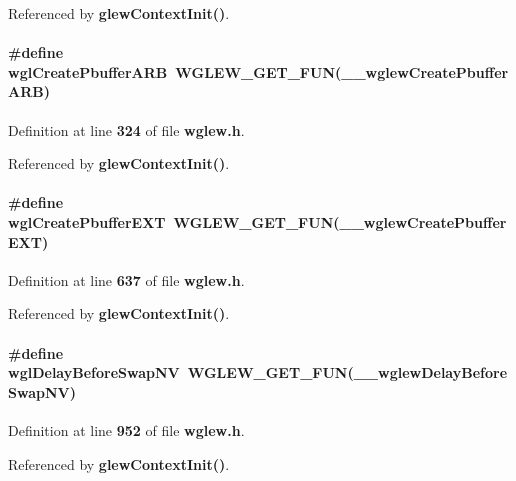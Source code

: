 Referenced by {\bf glew\+Context\+Init()}.

\paragraph[{wgl\+Create\+Pbuffer\+A\+RB}]{\setlength{\rightskip}{0pt plus 5cm}\#define wgl\+Create\+Pbuffer\+A\+RB~{\bf W\+G\+L\+E\+W\+\_\+\+G\+E\+T\+\_\+\+F\+UN}({\bf \+\_\+\+\_\+wglew\+Create\+Pbuffer\+A\+RB})}\label{wglew_8h_a19e4cd37146596d6608d175f909f643c}


Definition at line {\bf 324} of file {\bf wglew.\+h}.



Referenced by {\bf glew\+Context\+Init()}.

\paragraph[{wgl\+Create\+Pbuffer\+E\+XT}]{\setlength{\rightskip}{0pt plus 5cm}\#define wgl\+Create\+Pbuffer\+E\+XT~{\bf W\+G\+L\+E\+W\+\_\+\+G\+E\+T\+\_\+\+F\+UN}({\bf \+\_\+\+\_\+wglew\+Create\+Pbuffer\+E\+XT})}\label{wglew_8h_a3196763adc50b4b176a3a2bc9541bce9}


Definition at line {\bf 637} of file {\bf wglew.\+h}.



Referenced by {\bf glew\+Context\+Init()}.

\paragraph[{wgl\+Delay\+Before\+Swap\+NV}]{\setlength{\rightskip}{0pt plus 5cm}\#define wgl\+Delay\+Before\+Swap\+NV~{\bf W\+G\+L\+E\+W\+\_\+\+G\+E\+T\+\_\+\+F\+UN}({\bf \+\_\+\+\_\+wglew\+Delay\+Before\+Swap\+NV})}\label{wglew_8h_a93a1f7229d47f14b9092ef08d8975931}


Definition at line {\bf 952} of file {\bf wglew.\+h}.



Referenced by {\bf glew\+Context\+Init()}.

